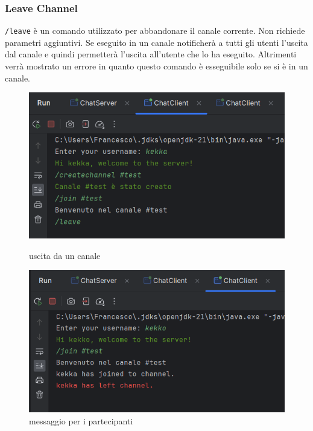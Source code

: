 \subsubsection{Leave Channel}
\texttt{/leave} è un comando utilizzato per abbandonare il canale corrente. Non richiede parametri aggiuntivi. Se eseguito in un canale notificherà a tutti gli utenti l'uscita dal canale e quindi permetterà l'uscita all'utente che lo ha eseguito. Altrimenti verrà mostrato un errore in quanto questo comando è esseguibile solo se si è in un canale.
\begin{figure}[h]
  \centering
  \begin{minipage}{0.45\textwidth}
    \includegraphics[width=\linewidth]{imagens/outputs/4.png}
    \caption{uscita da un canale}
  \end{minipage}\hfill
  \begin{minipage}{0.45\textwidth}
    \includegraphics[width=\linewidth]{imagens/outputs/4_2.png}
    \caption{messaggio per i partecipanti}
  \end{minipage}\hfill
\end{figure}
\newpage

